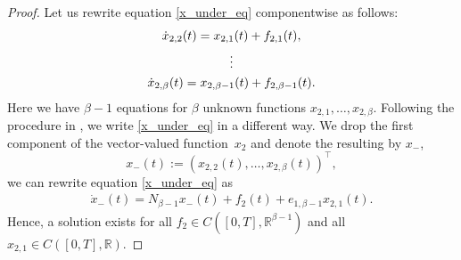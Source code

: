 \documentclass[preprint,12pt]{elsarticle}
\numberwithin{equation}{section}
\theoremstyle{definition}
\begin{document}
\begin{proof}
    Let us rewrite equation \eqref{x_under_eq} componentwise as follows:
\begin{gather*}\label{underdet_component}
\dot{x}_{2,2}(t)=x_{2,1}(t)+f_{2,1}(t),\notag\\
\vdots \\
\dot{x}_{2,\beta}(t)=x_{2,\beta-1}(t)+f_{2,\beta-1}(t).\notag
\end{gather*}
Here we have $\beta-1$ equations for $\beta$ unknown functions $x_{2,1}, \ldots,  x_{2,\beta}$.
Following the procedure in \cite{berger_diss}, we write \eqref{x_under_eq} in a different way. We drop the first component of the vector-valued 
function~$x_2$ and denote the resulting by $x_-$,
\begin{equation*}
x_-(t):=(x_{2,2}(t), \ldots, x_{2,\beta}(t))^\top,
\end{equation*}
we can rewrite equation \eqref{x_under_eq} as
\begin{align}
    \label{x-}
\dot{x}_-(t)=N_{\beta-1}x_-(t)+ f_2(t)+ e_{1,\beta-1}x_{2,1}(t).
\end{align}
Hence, a solution exists for all $f_2 \in C([0,T],\mathbb{R}^{\beta-1})$ and all $x_{2,1}\in C([0,T], \mathbb{R})$. 


\end{proof}
\end{document}
